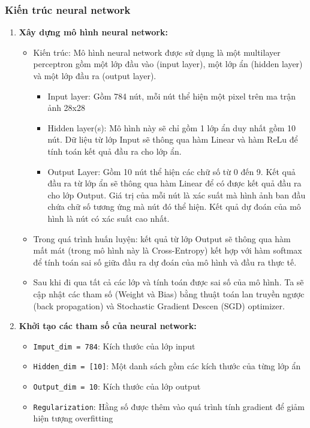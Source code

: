 \subsubsection{Kiến trúc neural network}
\begin{enumerate}
    \item \textbf{Xây dựng mô hình neural network:}
    \begin{itemize}
        \item Kiến trúc: Mô hình neural network được sử dụng là một multilayer perceptron gồm một lớp đầu vào (input layer), một lớp ẩn (hidden layer) và một lớp đầu ra (output layer). 
        \begin{itemize}
            \item Input layer: Gồm 784 nút, mỗi nút thể hiện một pixel trên ma trận ảnh 28x28
            \item Hidden layer(s): Mô hình này sẽ chỉ gồm 1 lớp ẩn duy nhất gồm 10 nút. Dữ liệu từ lớp Input sẽ thông qua hàm Linear và hàm ReLu để tính toán kết quả đầu ra cho lớp ẩn. 
            \item Output Layer: Gồm 10 nút thể hiện các chữ số từ 0 đến 9. Kết quả đầu ra từ lớp ẩn sẽ thông qua hàm Linear để có được kết quả đầu ra cho lớp Output. Giá trị của mỗi nút là xác suất mà hình ảnh ban đầu chứa chữ số tương ứng mà nút đó thể hiện. Kết quả dự đoán của mô hình là nút có xác suất cao nhất. 
        \end{itemize}
        \item Trong quá trình huấn luyện: kết quả từ lớp Output sẽ thông qua hàm mất mát (trong mô hình này là Cross-Entropy) kết hợp với hàm softmax để tính toán sai số giữa đầu ra dự đoán của mô hình và đầu ra thực tế.
        \item Sau khi đi qua tất cả các lớp và tính toán được sai số của mô hình. Ta sẽ cập nhật các tham số (Weight và Bias) bằng thuật toán lan truyền ngược (back propagation) và Stochastic Gradient Descen (SGD) optimizer.
    \end{itemize}
    \item \textbf{Khởi tạo các tham số của neural network:}
    \begin{itemize}
        \item \texttt{Imput\_dim = 784}: Kích thước của lớp input
        \item  \texttt{Hidden\_dim = [10]}: Một danh sách gồm các kích thước của từng lớp ẩn
        \item \texttt{Output\_dim = 10}: Kích thước của lớp output 
        \item \texttt{Regularization}: Hằng số được thêm vào quá trình tính gradient để giảm hiện tượng overfitting 

\end{itemize}
\end{enumerate}
